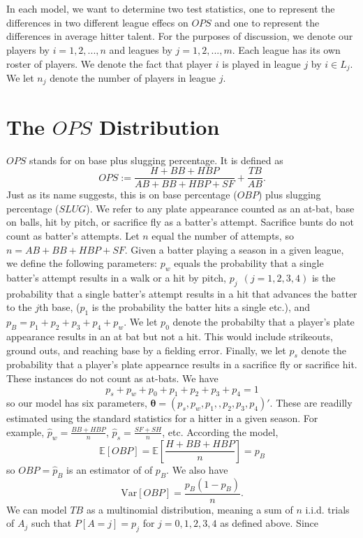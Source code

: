 \documentclass [52pt] {article}
\newcommand{\Exp}{\mathbb{E}}
\begin{document}
\\\\
In each model, we want to determine two test statistics, one to represent the differences in two different league effecs on $OPS$ and one to represent the differences in average hitter talent.  For the purposes of discussion, we denote our players by $i = 1,2,...,n$ and leagues by $j = 1,2,...,m$.  Each league has its own roster of players.  We denote the fact that player $i$ is played in league $j$ by $i\in L_j$.  We let $n_j$ denote the number of players in league $j$.

\section{The $OPS$ Distribution}\label{subsec : ops}
$OPS$ stands for on base plus slugging percentage.  It is defined as
\[OPS :=\frac{H+BB+HBP}{AB+BB+HBP+SF} +\frac{TB}{AB}.\]
Just as its name suggests, this is on base percentage ($OBP$)  plus slugging percentage ($SLUG$).  We refer to any plate appearance counted as an at-bat, base on balls, hit by pitch, or sacrifice fly as a batter's attempt.  Sacrifice bunts do not count as batter's attempts.  Let $n$ equal the number of attempts, so $n = AB+BB+HBP+SF$.  Given a batter playing a season in a given league, we define the following parameters: $p_w$ equals the probability that a single batter's attempt results in a walk or a hit by pitch, $p_j\:\: (j = 1,2,3,4)$ is the probability that a single batter's attempt results in a hit that advances the batter to the $j$th base,  ($p_1$ is the probability the batter hits a single etc.), and $p_B= p_1+p_2+p_3+p_4+p_w$.  We let $p_0$ denote the probabilty that a player's plate appearance results in an at bat but not a hit.  This would include strikeouts, ground outs, and reaching base by a fielding error.  Finally, we let $p_s$ denote the probability that a player's plate appearnce results in a sacrifice fly or sacrifice hit.  These instances do not count as at-bats.  We have 
\[p_s+p_w+p_0+p_1+p_2+p_3+p_4 = 1\]
so our model has six parameters, $\pmb\theta = (p_s,p_w,p_1,,p_2,p_3,p_4)'$.  These are readilly estimated using the standard statistics for a hitter in a given season.  For example, $\hat{p}_w = \frac{BB+HBP}{n}$, $\hat{p}_s = \frac{SF + SH}{n}$, etc.  According the model,
\[ \Exp[OBP] = \Exp\left[\frac{H+BB+HBP}{n}\right]= {p}_B\]
so $OBP=\hat{p}_B$ is an estimator of of $p_B$.  We also have
\[\text{Var}[OBP] = \frac{p_B(1-p_B)}{n}.\] 
We can model $TB$ as a multinomial distribution, meaning a sum of $n$ i.i.d. trials of $A_j$ such that $P[A = j] = p_j$ for $j = 0,1,2,3,4$ as defined above.  Since 
\end{document}
